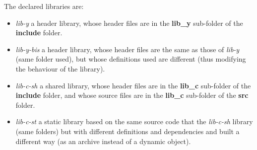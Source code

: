 \documentclass[12pt,a4paper]{article}
\begin{document}
The declared libraries are:
\begin{itemize}
\item \textit{lib-y} a header library, whose header files are in the \textbf{lib\_y} sub-folder of the \textbf{include} folder.
\item \textit{lib-y-bis} a header library, whose header files are the same as those of \textit{lib-y} (same folder used), but whose definitions used are different (thus modifying the behaviour of the library).
\item \textit{lib-c-sh} a shared library, whose header files are in the \textbf{lib\_c} sub-folder of the \textbf{include} folder, and whose source files are in the \textbf{lib\_c} sub-folder of the \textbf{src} folder.
\item \textit{lib-c-st} a static library based on the same source code that the \textit{lib-c-sh} library (same folders) but with different definitions and dependencies and built a different way (as an archive instead of a dynamic object).
\end{itemize}
\end{document}
